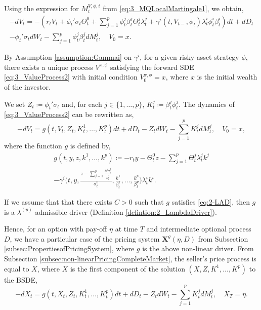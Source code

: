 \documentclass[11pt,a4paper]{article}
\numberwithin{equation}{section}
\theoremstyle{newPlain}
\theoremstyle{newDefinition}
\theoremstyle{newRemark}
\begin{document}
Using the expression for $M_t^{V,\phi,i}$ from \eqref{eq:3_MQLocalMartingale1}, we obtain,
\begin{multline}\label{eq:3_ValueProcess2}
    -dV_t = -\left(r_tV_t + \phi_t'\sigma_t\Theta_t^0 + \sum_{j=1}^p\phi_t^j\beta_t^j\Theta_t^j\lambda_t^j + \gamma^i(t,V_{t-},\phi_t)\lambda_t^i\phi_t^i\beta_t^i\right)dt + dD_t \\- \phi_t'\sigma_tdW_t - \sum_{j=1}^p\phi_t^j\beta_t^jdM_t^j,\quad V_0=x.
\end{multline}

By Assumption \ref{assumption:Gammai} on $\gamma^i$, for a given risky-asset strategy $\phi$,  there exists a unique process $V^{x,\phi}$ satisfying the forward SDE \eqref{eq:3_ValueProcess2} with initial condition $V_0^{x,\phi}=x$, where $x$ is the initial wealth of the investor.

We set $Z_t \coloneq \phi_t'\sigma_t$ and,  for each $j\in\{1,\ldots,p\}$,  $K_t^j\coloneq\beta_t^j\phi_t^j$. The dynamics of \eqref{eq:3_ValueProcess2} can be rewritten as,
\begin{equation}\label{eq:3_ValueProcess3}
    -dV_t = g(t,V_t,Z_t,K_t^1,\ldots,K_t^p)dt + dD_t - Z_tdW_t - \sum_{j=1}^pK_t^jdM_t^j,\quad V_0=x,
\end{equation}
where the function $g$ is defined  by,
\begin{multline*}
    g(t,y,z,k^1,\ldots,k^p) \coloneqq -r_ty - \Theta_t^0z - \sum_{j=1}^p\Theta_t^j\lambda_t^jk^j\\ - \gamma^i\Big(t,y,\frac{z-\sum_{j=1}^p\frac{k^j\sigma_t^j}{\beta_t^j}}{\sigma_t^0},\frac{k^1}{\beta_t^1},\ldots,\frac{k^p}{\beta_t^p}\Big)\lambda_t^ik^i.
\end{multline*}

If we assume that that there exists $C>0$ such that $g$ satisfies \eqref{eq:2-LAD}, then $g$ is  a $\lambda^{(p)}$-admissible driver (Definition \ref{defintion:2_LambdaDriver}).

Hence, for an option with pay-off $\eta$ at time $T$ and intermediate optional process $D$,  we have  a particular case of the pricing system $\mathbf{X}^g(\eta,D)$ from Subsection \ref{subsec:PropertiesofPricingSystem}, where $g$ is the above non-linear driver. %
From Subsection \ref{subsec:non-linearPricingCompleteMarket}, the seller's price process is  equal to $X$, where $X$ is the first component of the solution $(X,Z,K^1,\ldots,K^p)$ to the BSDE,
\begin{equation}\label{eq:3_non-linearBSDE1}
    -dX_t = g(t,X_t,Z_t,K_t^1,\ldots,K_t^p)dt + dD_t - Z_tdW_t - \sum_{j=1}^pK_t^jdM_t^j,\quad X_T = \eta.
\end{equation}
\end{document}
